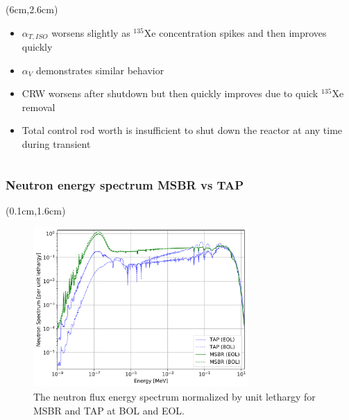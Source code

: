 \begin{frame}
\begin{textblock*}{12.5cm}
\begin{columns}
		\column[t]{6cm}
		\begin{textblock*}{6.7cm}(6cm,2.6cm) %
			\begin{itemize}
				\itemsep=0.8em
				\item<1-> $\alpha_{T,ISO}$ worsens slightly as $^{135}$Xe 
				concentration spikes and then improves quickly
				\item<2-> $\alpha_V$ demonstrates similar behavior
				\item<3-> CRW worsens after shutdown but then quickly 
				improves due to quick $^{135}$Xe removal
				\item<4-> Total control rod worth is insufficient to shut down 
				the reactor at any time during transient
			\end{itemize}
			
		\end{textblock*}
	\end{columns}
\end{textblock*}
\end{frame}


\begin{frame}
\frametitle{Neutron energy spectrum MSBR vs TAP}
\begin{textblock*}{12.6cm}(0.1cm,1.6cm) %
	\begin{figure}[htp!] %
		\centerline{\includegraphics[width=0.73\textwidth]{../dissertation/figures/ch6/msbr_vs_tap_spectrum.png}}
		\vspace{-3mm}
		\caption{The neutron flux energy spectrum normalized by unit lethargy 
		for 
			MSBR and TAP at BOL and EOL. }
	\end{figure}
\end{textblock*}
\end{frame}